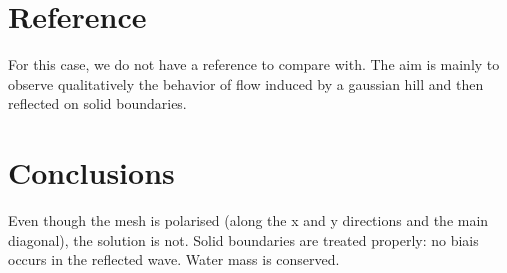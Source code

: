 \section{Reference}
For this case, we do not have a reference to compare with. The aim is mainly to
observe qualitatively the behavior of flow induced by a gaussian hill and then
reflected on solid boundaries.

\section{ Conclusions}

Even though the mesh is polarised (along the x and y directions and the main
diagonal), the solution is not.
Solid boundaries are treated properly: no biais occurs in the reflected wave.
Water mass is conserved.

